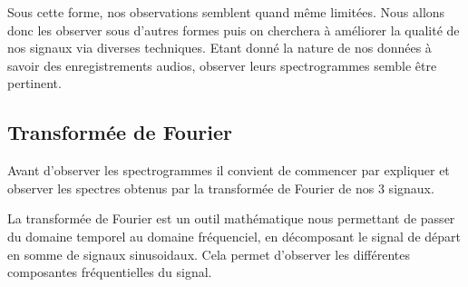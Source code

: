 Sous cette forme, nos observations semblent quand même limitées. 
Nous allons donc les observer sous d'autres formes puis on cherchera à améliorer la qualité de nos signaux via diverses techniques. Etant donné la nature de nos données à savoir des enregistrements audios, observer leurs spectrogrammes semble être pertinent.

\hypertarget{Transformuxe9-de-Fourier}{%
\subsection{Transformée de Fourier}
\label{Transformuxe9-de-Fourier}}

Avant d'observer les spectrogrammes il convient de commencer par expliquer et observer les spectres obtenus par la transformée de Fourier de nos 3 signaux.

La transformée de Fourier est un outil mathématique nous permettant de passer du domaine temporel au domaine fréquenciel, en décomposant le signal de départ en somme de signaux sinusoidaux.
Cela permet d'observer les différentes composantes fréquentielles du signal. 

